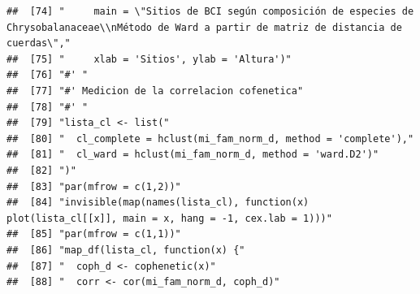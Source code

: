 \documentclass[11pt,]{article}
\begin{document}
\begin{verbatim}
##  [74] "     main = \"Sitios de BCI según composición de especies de Chrysobalanaceae\\nMétodo de Ward a partir de matriz de distancia de cuerdas\","                          
##  [75] "     xlab = 'Sitios', ylab = 'Altura')"                                                                                                                                
##  [76] "#' "                                                                                                                                                                   
##  [77] "#' Medicion de la correlacion cofenetica"                                                                                                                              
##  [78] "#' "                                                                                                                                                                   
##  [79] "lista_cl <- list("                                                                                                                                                     
##  [80] "  cl_complete = hclust(mi_fam_norm_d, method = 'complete'),"                                                                                                           
##  [81] "  cl_ward = hclust(mi_fam_norm_d, method = 'ward.D2')"                                                                                                                 
##  [82] ")"                                                                                                                                                                     
##  [83] "par(mfrow = c(1,2))"                                                                                                                                                   
##  [84] "invisible(map(names(lista_cl), function(x) plot(lista_cl[[x]], main = x, hang = -1, cex.lab = 1)))"                                                                    
##  [85] "par(mfrow = c(1,1))"                                                                                                                                                   
##  [86] "map_df(lista_cl, function(x) {"                                                                                                                                        
##  [87] "  coph_d <- cophenetic(x)"                                                                                                                                             
##  [88] "  corr <- cor(mi_fam_norm_d, coph_d)"                                                                                                                                  

\end{verbatim}
\end{document}
